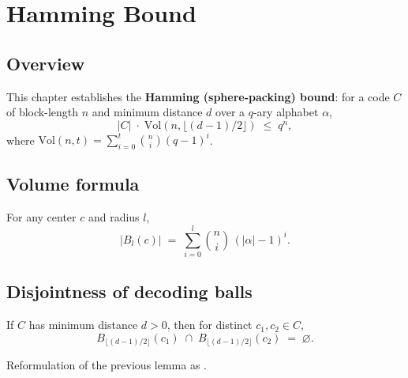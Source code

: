\chapter{Hamming Bound}
\section{Overview}

This chapter establishes the \textbf{Hamming (sphere-packing) bound}: for a code $C$
of block-length $n$ and minimum distance $d$ over a $q$-ary alphabet $\alpha$,
\[
|C| \;\cdot\; \mathrm{Vol}(n,\lfloor(d-1)/2\rfloor)
\;\le\; q^n,
\]
where $\mathrm{Vol}(n,t) = \sum_{i=0}^{t}\binom{n}{i}(q-1)^i$.

\section{Volume formula}

\begin{theorem}
\leanok
For any center $c$ and radius $l$,
\[
|B_l(c)| \;=\; \sum_{i=0}^{l} \binom{n}{i}\,(|\alpha|-1)^i.
\]
\end{theorem}

\section{Disjointness of decoding balls}

\begin{lemma}
\leanok
{}
If $C$ has minimum distance $d>0$, then for distinct $c_1,c_2\in C$,
\[
B_{\lfloor(d-1)/2\rfloor}(c_1)
\;\cap\;
B_{\lfloor(d-1)/2\rfloor}(c_2)
\;=\;\varnothing.
\]
\end{lemma}

\begin{lemma}
\leanok
{}
Reformulation of the previous lemma as .
\end{lemma}

